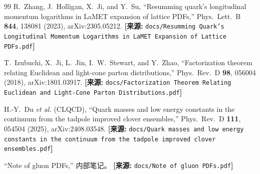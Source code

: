 \documentclass[12pt,a4paper]{ctexart}
\theoremstyle{definition}
\begin{document}
\begin{thebibliography}{99}
R.~Zhang, J.~Holligan, X.~Ji, and Y.~Su,
``Resumming quark's longitudinal momentum logarithms in LaMET expansion of lattice PDFs,''
Phys.\ Lett.\ B \textbf{844}, 138081 (2023), arXiv:2305.05212.
\quad\textbf{[来源:} \texttt{docs/Resumming Quark's Longitudinal Momentum Logarithms in LaMET Expansion of Lattice PDFs.pdf}\textbf{]}

T.~Izubuchi, X.~Ji, L.~Jin, I.~W.~Stewart, and Y.~Zhao,
``Factorization theorem relating Euclidean and light-cone parton distributions,''
Phys.\ Rev.\ D \textbf{98}, 056004 (2018), arXiv:1801.03917.
\quad\textbf{[来源:} \texttt{docs/Factorization Theorem Relating Euclidean and Light-Cone Parton Distributions.pdf}\textbf{]}

H.-Y.~Du \textit{et al.} (CLQCD),
``Quark masses and low energy constants in the continuum from the tadpole improved clover ensembles,''
Phys.\ Rev.\ D \textbf{111}, 054504 (2025), arXiv:2408.03548.
\quad\textbf{[来源:} \texttt{docs/Quark masses and low energy constants in the continuum from the tadpole improved clover ensembles.pdf}\textbf{]}

``Note of gluon PDFs,''
内部笔记。
\quad\textbf{[来源:} \texttt{docs/Note of gluon PDFs.pdf}\textbf{]}

\end{thebibliography}
\end{document}
